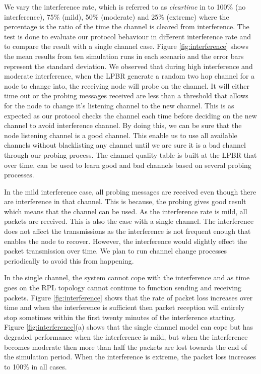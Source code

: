 We vary the interference rate, which is referred to as \emph{clear\textunderscore time} in \cite{Boano:2010:MSM:2127940.2127963} to 100\% (no interference), 75\% (mild), 50\% (moderate) and 25\% (extreme) where the percentage is the ratio of the time the channel is cleared from interference. The test is done to evaluate our protocol behaviour in different interference rate and to compare the result with a single channel case. Figure \ref{fig:interference} shows the mean results from ten simulation runs in each scenario and the error bars represent the standard deviation. We observed that during high interference and moderate interference, when the LPBR generate a random two hop channel for a node to change into, the receiving node will probe on the channel. It will either time out or the probing messages received are less than a threshold that allows for the node to change it's listening channel to the new channel. This is as expected as our protocol checks the channel each time before deciding on the new channel to avoid interference channel. By doing this, we can be sure that the node listening channel is a good channel. This enable us to use all available channels without blacklisting any channel until we are sure it is a bad channel through our probing process. The channel quality table is built at the LPBR that over time, can be used to learn good and bad channels based on several probing processes. 

In the mild interference case, all probing messages are received even though there are interference in that channel. This is because, the probing gives good result which means that the channel can be used. As the interference rate is mild, all packets are received. This is also the case with a single channel. The interference does not affect the transmissions as the interference is not frequent enough that enables the node to recover. However, the interference would slightly effect the packet transmission over time. We plan to run channel change processes periodically to avoid this from happening. %

In the single channel,  the system cannot cope with the interference and as time goes on the RPL topology cannot continue to function sending and receiving packets. Figure \ref{fig:interference} shows that the rate of packet loss increases over time and when the interference is sufficient then packet reception will entirely stop sometimes within the first twenty minutes of the interference starting.  Figure \ref{fig:interference}(a) shows that the single channel model can cope but has degraded performance when the interference is mild, but when the interference becomes moderate then more than half the packets are lost towards the end of the simulation period.  When the interference is extreme, the packet loss increases to 100\% 
in all cases.

